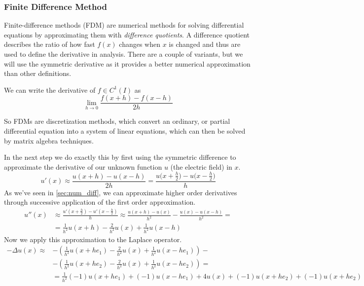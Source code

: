 \subsubsection{Finite Difference Method}
Finite-difference methods (FDM) are numerical methods for solving differential equations by approximating them with \emph{difference quotients}.
A difference quotient describes the ratio of how fast \(f(x)\) changes when \(x\) is changed and thus are used to define the derivative in analysis.
There are a couple of variants, but we will use the symmetric derivative as it provides a better numerical approximation than other definitions.
\begin{definition}
   We can write the derivative of \(f \in C^1(I)\) as
   \[\lim_{h \to 0} \frac{f(x + h) - f(x - h)}{2h}\]
\end{definition}
So FDMs are discretization methods, which convert an ordinary, or partial differential equation into a system of linear equations, which can then be solved by matrix algebra techniques.

In the next step we do exactly this by first using the symmetric difference to approximate the derivative of our unknown function \(u\) (the electric field) in \(x\).
\[u'(x) \approx \frac{u(x + h) - u(x - h)}{2h} = \frac{u\big(x + \frac{h}{2}\big) - u\big(x - \frac{h}{2}\big)}{h}\]
As we've seen in \cref{sec:num_diff}, we can approximate higher order derivatives through successive application of the first order approximation.
\begin{equation*}
   \begin{split}
      u''(x) & \approx \frac{u'\left(x + \frac{h}{2}\right) - u'\left(x - \frac{h}{2}\right)}{h} \approx \frac{u(x + h) - u(x)}{h^2} - \frac{u(x) - u(x - h)}{h^2} = \\
             & = \frac{1}{h^2}u(x + h) - \frac{2}{h^2}u(x) + \frac{1}{h^2}u(x - h)
   \end{split}
\end{equation*}
Now we apply this approximation to the Laplace operator.
\begin{equation*}
   \begin{split}
      -\Delta u(x) \approx & -\left(\frac{1}{h^2}u(x + he_1) - \frac{2}{h^2}u(x) + \frac{1}{h^2} u(x - he_1)\right) - \\
                           & - \left(\frac{1}{h^2} u(x + he_2) - \frac{2}{h^2} u(x) + \frac{1}{h^2}u(x-he_2) \right) = \\
                           & = \frac{1}{h^2} (-1)u(x+he_1) + (-1)u(x-he_1) + 4u(x) + (-1)u(x+he_2) + (-1)u(x+he_2)
   \end{split}
\end{equation*}

